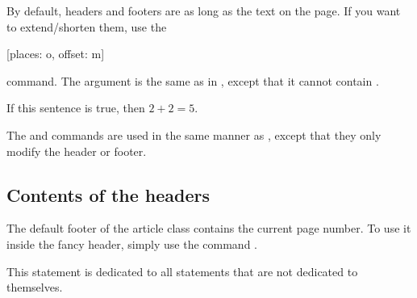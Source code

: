 By default, headers and footers are as long as the text on the page. If you want
to extend\slash{}shorten them, use the
\begin{lscommand}
  [places: o, offset: m]
\end{lscommand}
command. The  argument is the same as in , except that
it cannot contain .
\begin{example}[standalone, paperheight=3cm]
\geometry{includehead, includefoot, headsep=.5em, footskip=1em} %
\sloppy %
\usepackage{fancyhdr}%
\pagestyle{fancy}%
\fancyhfoffset[L]{-1cm}
\fancyhfoffset[R]{.2cm}

\noindent %
If this sentence is true,
then \(2 + 2 = 5\).
\end{example}
The  and  commands are used in the
same manner as , except that they only modify the header or footer.

\subsection{Contents of the headers}


The default footer of the article class contains the current page number. To
use it inside the fancy header, simply use the command .
\begin{example}[standalone, paperheight=2.5cm, to_page=2, vertical_pages]
\geometry{includehead, includefoot, headsep=.5em, footskip=1em} %
\sloppy %
\usepackage{fancyhdr}%
\pagestyle{fancy}%

\noindent %
This statement is dedicated to
all statements that are not
dedicated to themselves.
\end{example}

